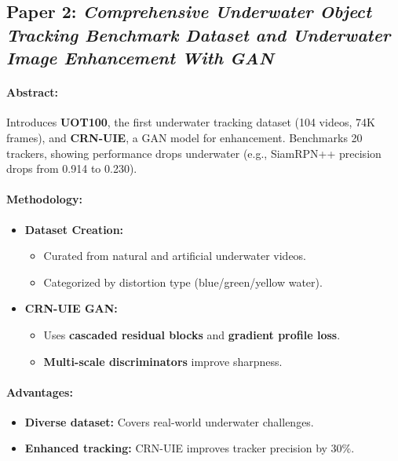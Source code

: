 \documentclass{article}
\begin{document}
\subsection{Paper 2: \textit{Comprehensive Underwater Object Tracking Benchmark Dataset and Underwater Image Enhancement With GAN}}

\paragraph{Abstract:}  
Introduces \textbf{UOT100}, the first underwater tracking dataset (104 videos, 74K frames), and \textbf{CRN-UIE}, a GAN model for enhancement. Benchmarks 20 trackers, showing performance drops underwater (e.g., SiamRPN++ precision drops from 0.914 to 0.230).

\paragraph{Methodology:}
\begin{itemize}
    \item \textbf{Dataset Creation:}
    \begin{itemize}
        \item Curated from natural and artificial underwater videos.
        \item Categorized by distortion type (blue/green/yellow water).
    \end{itemize}

    \item \textbf{CRN-UIE GAN:}
    \begin{itemize}
        \item Uses \textbf{cascaded residual blocks} and \textbf{gradient profile loss}.
        \item \textbf{Multi-scale discriminators} improve sharpness.
    \end{itemize}
\end{itemize}

\paragraph{Advantages:}
\begin{itemize}
    \item \textbf{Diverse dataset:} Covers real-world underwater challenges.
    \item \textbf{Enhanced tracking:} CRN-UIE improves tracker precision by 30\%.
\end{itemize}
\end{document}
